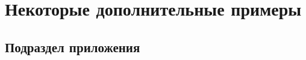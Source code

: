 \chapter{Некоторые дополнительные примеры}\label{appendix-extra-examples}							%


\section{Подраздел приложения}\label{app-2-1}							
